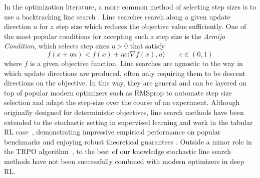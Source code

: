 \documentclass[10pt]{article} %
\newcommand{\update}{u}
\newcommand{\stepSize}{\eta}
\newcommand{\inner}[2]{\langle #1, #2 \rangle}
\begin{document}
In the optimization literature, a more common method of selecting step sizes is to use a backtracking
line search \citep{nocedal2006numerical}. Line searches search along a given update direction $\update$ for a step size
which reduces the objective value sufficiently. One of the most popular conditions for accepting such a step size is the
\textit{Armijo Condition}, which selects step sizes $\stepSize > 0$ that satisfy
%
\begin{equation}
	f(x + \stepSize u) < f(x) + \stepSize c \inner{\nabla f(x)}{u} \qquad c \in (0, 1)
	\label{eq:armijo_cond}
\end{equation}
%
where $f$ is a given objective function.
Line searches are agnostic to the way in which update directions are
produced, often only requiring them to be descent directions on the objective. In this way, they are 
general and can be layered on top of popular modern optimizers such as RMSprop \citep{Hinton2012lecture} to automate step size selection and adapt the step-size over the course of an experiment.
Although originally designed for deterministic objectives, line search methods have been
extended to the stochastic setting in supervised learning and work in the tabular RL case~\citep{lu2024towards}, demonstrating impressive empirical performance on
popular benchmarks and enjoying robust theoretical guarantees \citep{vaswani2019painless,galli2023monotone,shea2024so,vaswani2020adaptive,fox2024glocal,vaswani2025armijo,fan2023bisls,jiang2023adaptive}. Outside a minor role in the TRPO algorithm~\citep{schulman2017trust}, to the best of our knowledge stochastic line search methods have not been successfully combined with modern optimizers in deep RL. 
\end{document}
